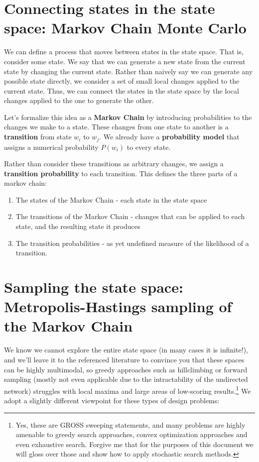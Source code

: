\documentclass[]{article}
\begin{document}
\section{Connecting states in the state space: Markov Chain Monte Carlo}

We can define a process that moves between states in the state space. That is, consider some state. We say that we can generate a new state from the current state by changing the current state. Rather than naively say we can generate any possible state directly, we consider a set of small local changes applied to the current state. Thus, we can connect the states in the state space by the local changes applied to the one to generate the other. 

Let's formalize this idea as a \textbf{Markov Chain} by introducing probabilities to the changes we make to a state. These changes from one state to another is a \textbf{transition} from state $w_i$ to $w_j$. We already have a \textbf{probability model} that assigns a numerical probability $P(w_i)$ to every state.

Rather than consider these transitions as arbitrary changes, we assign a \textbf{transition probability} to each transition. This defines the three parts of a markov chain:
\begin{enumerate}
	\item The states of the Markov Chain - each state in the state space
	\item The transitions of the Markov Chain - changes that can be applied to each state, and the resulting state it produces
	\item The transition probabilities - as yet undefined measure of the likelihood of a transition.
\end{enumerate}

\section{Sampling the state space: Metropolis-Hastings sampling of the Markov Chain}

We know we cannot explore the entire state space (in many cases it is infinite!), and we'll leave it to the referenced literature to convince you that these spaces can be highly multimodal, so greedy approaches such as hillclimbing or forward sampling (mostly not even applicable due to the intractability of the undirected network) struggles with local maxima and large areas of low-scoring results.\footnote{Yes, these are GROSS sweeping statements, and many problems are highly amenable to greedy search approaches, convex optimization approaches and even exhaustive search. Forgive me that for the purposes of this document we will gloss over those and show how to apply stochastic search methods.} We adopt a slightly different viewpoint for these types of design problems: 
\end{document}
